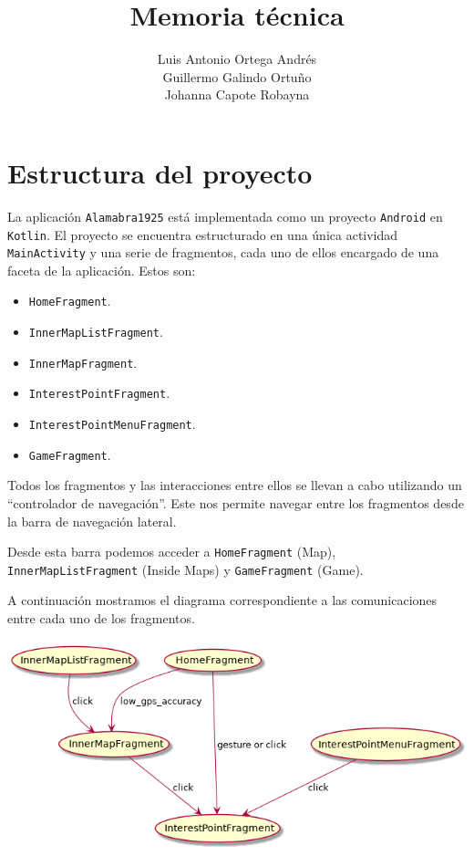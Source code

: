 \documentclass[11pt]{article}
\author{Luis Antonio Ortega Andrés  \\Guillermo Galindo Ortuño  \\ Johanna Capote Robayna}
\date{}
\title{Memoria técnica}
\begin{document}
\maketitle

\section{Estructura del proyecto}
\label{sec:orgcea4ad5}

La aplicación \texttt{Alamabra1925} está implementada como un proyecto \texttt{Android} en \texttt{Kotlin}.
El proyecto se encuentra estructurado en una única actividad \texttt{MainActivity} y una serie de fragmentos, cada uno de ellos encargado de una faceta de la aplicación.
Estos son:
\begin{itemize}
\item \texttt{HomeFragment}.
\item \texttt{InnerMapListFragment}.
\item \texttt{InnerMapFragment}.
\item \texttt{InterestPointFragment}.
\item \texttt{InterestPointMenuFragment}.
\item \texttt{GameFragment}.
\end{itemize}

Todos los fragmentos y las interacciones entre ellos se llevan a cabo utilizando un ``controlador de navegación''. Este nos permite navegar entre los fragmentos desde la barra de navegación lateral. 

Desde esta barra podemos acceder a \texttt{HomeFragment} (Map), \texttt{InnerMapListFragment}
(Inside Maps) y \texttt{GameFragment} (Game).

A continuación mostramos el diagrama correspondiente a las comunicaciones entre cada uno de los fragmentos. 

\begin{center}
\includegraphics[width=.9\linewidth]{./diagrama1.png}
\end{center}
\end{document}
